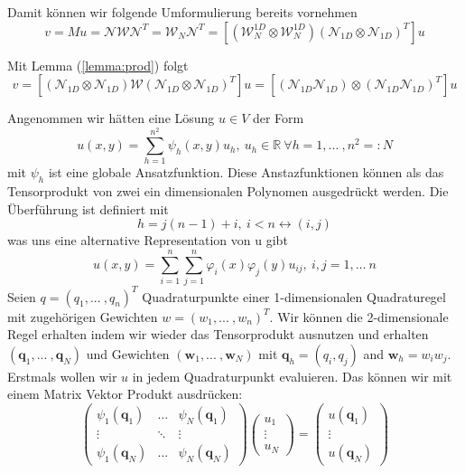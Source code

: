 Damit können wir folgende Umformulierung bereits vornehmen
\begin{equation}
v=Mu= \mathcal{N} \mathcal{W} \mathcal{N}^T= \mathcal{W}_N \mathcal{N}^T =  [(\mathcal{W}_N^{1D} \otimes \mathcal{W}_N^{1D})  (\mathcal{N}_{1D} \otimes \mathcal{N}_{1D})^T]u
\end{equation}

Mit Lemma (\ref{lemma:prod}) folgt
\begin{equation}
v= [(\mathcal{N}_{1D} \otimes \mathcal{N}_{1D}) \mathcal{W} (\mathcal{N}_{1D} \otimes \mathcal{N}_{1D})^T]u = [(\mathcal{N}_{1D} \mathcal{N}_{1D}) \otimes (\mathcal{N}_{1D}\mathcal{N}_{1D})^T]u
\end{equation}
\newpage


Angenommen wir hätten eine Lösung $u \in V$ der Form
\begin{equation}
u(x,y)=\sum_{h=1}^{n^2} \psi_h (x,y) u_h,\ u_h \in \mathbb{R} \ \forall h =1,...\ ,n^2=:N
\end{equation}
mit $\psi_h$ ist eine globale Ansatzfunktion. Diese Anstazfunktionen können als das Tensorprodukt von zwei ein dimensionalen Polynomen ausgedrückt werden. Die Überführung ist definiert mit
\begin{equation}
h=j(n-1)+i,\ i<n \leftrightarrow (i,j)
\end{equation}
was uns eine alternative Representation von u gibt
\begin{equation}
u(x,y)=\sum_{i=1}^n \sum_{j=1}^n \varphi_i(x) \varphi_j(y) u_{ij}, \ i,j =1,...\ n
\end{equation}
Seien $q=(q_1,...\ ,q_n)^T$ Quadraturpunkte einer 1-dimensionalen Quadraturegel mit zugehörigen Gewichten $w=(w_1,...\ ,w_n)^T$. Wir können die 2-dimensionale Regel erhalten indem wir wieder das Tensorprodukt ausnutzen und erhalten  $(\bm{q}_1,...\ ,\bm{q}_N)$ und Gewichten $(\bm{w}_1,...\ ,\bm{w}_N)$ mit $\bm{q}_h=(q_i,q_j)$ and $\bm{w}_h=w_i w_j$.\\
Erstmals wollen wir $u$ in jedem Quadraturpunkt evaluieren. Das können wir mit einem Matrix Vektor Produkt ausdrücken:
\begin{equation}
\begin{pmatrix}
\psi_1(\bm{q}_1) & \hdots & \psi_N(\bm{q}_1) \\
\vdots & \ddots & \vdots \\
\psi_1(\bm{q}_N) & \hdots & \psi_N(\bm{q}_N)
\end{pmatrix}
\begin{pmatrix}
u_1 \\
\vdots \\
u_N
\end{pmatrix}
=
\begin{pmatrix}
u(\bm{q}_1) \\
\vdots \\
u(\bm{q}_N)
\end{pmatrix}
\end{equation}

